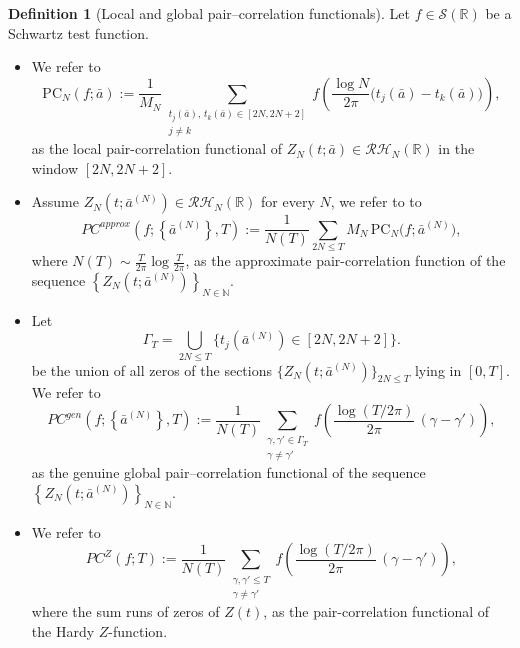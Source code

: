\documentclass[12pt,reqno]{amsart}
\theoremstyle{plain}
\theoremstyle{definition}
\newtheorem{dfn}{Definition}[section]   %
\theoremstyle{remark}
\begin{document}
\begin{dfn}[Local and global pair–correlation functionals]
Let $f\in \mathcal{S}(\mathbb R)$ be a Schwartz test function.
\begin{itemize}

\item[(i)] We refer to 
\begin{equation}
\label{eq:local-PC}
\mathrm{PC}_N(f;\bar a)
:=\frac{1}{M_N}\!\!\sum_{\substack{t_j(\bar a),\,t_k(\bar a)\in[2N,2N+2]\\ j\neq k}}
f\!\left(\frac{\log N}{2\pi}\bigl(t_j(\bar a)-t_k(\bar a)\bigr)\right),
\end{equation}
as the local pair-correlation functional of $Z_N(t; \bar a) \in \mathcal{RH}_N(\mathbb{R})$ in the window $[2N,2N+2]$. 
 
\item[(ii)] Assume $Z_N(t;\bar a^{(N)})\in\mathcal{RH}_N(\mathbb R)$ for every $N$, we refer to to
\begin{equation}
PC^{approx}(f; \left \{ \bar a^{(N)} \right \} , T)
:=\frac{1}{N(T)}\sum_{2N\le T} M_N\,\mathrm{PC}_N\!\bigl(f;\bar a^{(N)}\bigr),
\end{equation} 
where $N(T)\sim \tfrac{T}{2\pi}\log\frac{T}{2\pi}$,  as the approximate pair-correlation function of the sequence $\left \{ Z_N(t;\bar a^{(N)}) \right \}_{N \in \mathbb{N}}$. 

\item[(iii)] Let 
\begin{equation}
\Gamma_T=\bigcup_{2N\le T}\bigl\{t_j(\bar a^{(N)})\in[2N,2N+2]\bigr\}.
\end{equation} 
be the union of all zeros of the sections
$\{Z_N(t;\bar a^{(N)})\}_{2N\le T}$ lying in $[0,T]$. We refer to 
\begin{equation}\label{eq:R2-genuine}
PC^{gen}(f; \left \{ \bar a^{(N)} \right \}, T)
:=\frac{1}{N(T)}
\!\!\sum_{\substack{\gamma,\gamma'\in\Gamma_T\\ \gamma\ne\gamma'}}
f\!\left(\frac{\log(T/2\pi)}{2\pi}\,(\gamma-\gamma')\right),
\end{equation}
as the genuine global pair–correlation functional of the sequence  $\left \{ Z_N(t;\bar a^{(N)}) \right \}_{N \in \mathbb{N}}$. 

\item[(iv)] We refer to 
\begin{equation}\label{eq:R2-Z}
PC^{Z}(f; T)
:=\frac{1}{N(T)}
\!\!\sum_{\substack{\gamma,\gamma' \leq T\\ \gamma\ne\gamma'}}
f\!\left(\frac{\log(T/2\pi)}{2\pi}\,(\gamma-\gamma')\right),
\end{equation} where the sum runs of zeros of $Z(t)$, as the pair-correlation functional of the Hardy $Z$-function. 
\end{itemize}
\end{dfn}
\end{document}
